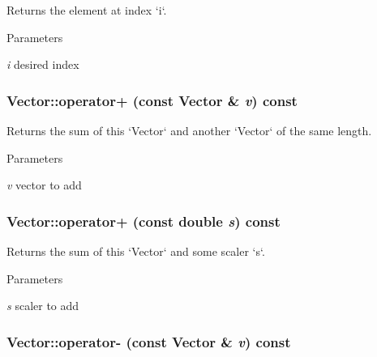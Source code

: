 Returns the element at index `i`. 
\begin{DoxyParams}{Parameters}
\item[{\em i}]desired index \end{DoxyParams}
\hypertarget{classcs1730_1_1Vector_a98369ba060b6c264b596ce30e7ad6b8d}{
\subsubsection[{operator+}]{ Vector::operator+ (const {\bf Vector} \& {\em v}) const}}
\label{classcs1730_1_1Vector_a98369ba060b6c264b596ce30e7ad6b8d}


Returns the sum of this `Vector` and another `Vector` of the same length. 
\begin{DoxyParams}{Parameters}
\item[{\em v}]vector to add \end{DoxyParams}
\hypertarget{classcs1730_1_1Vector_a730dd3d4c20c41407ae908458a06181b}{
\subsubsection[{operator+}]{ Vector::operator+ (const double {\em s}) const}}
\label{classcs1730_1_1Vector_a730dd3d4c20c41407ae908458a06181b}


Returns the sum of this `Vector` and some scaler `s`. 
\begin{DoxyParams}{Parameters}
\item[{\em s}]scaler to add \end{DoxyParams}
\hypertarget{classcs1730_1_1Vector_ac7b9814871af89597bd0888d7db966de}{
\subsubsection[{operator-\/}]{ Vector::operator-\/ (const {\bf Vector} \& {\em v}) const}}
\label{classcs1730_1_1Vector_ac7b9814871af89597bd0888d7db966de}


